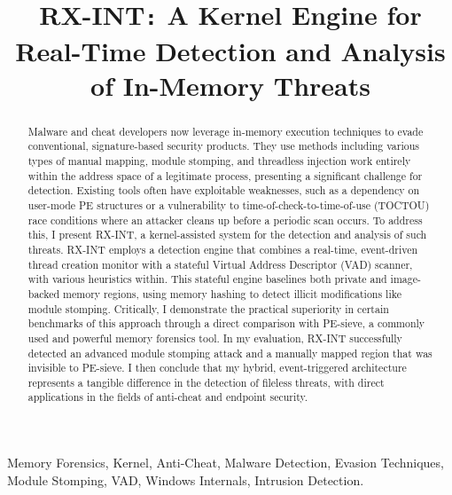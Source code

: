 \documentclass[journal]{IEEEtran}
\title{RX-INT\texttt{:} A Kernel Engine for Real-Time Detection and Analysis of In-Memory Threats}
\author{%
    \IEEEauthorblockN{Arjun Juneja \\}
    \IEEEauthorblockA{School of Electronics and Computer Science\\
    University of Southampton\\
    aj2g24@soton.ac.uk}
}
\begin{document}
\maketitle

\begin{abstract}
Malware and cheat developers now leverage in-memory execution techniques to evade conventional, signature-based security products. They use methods including various types of manual mapping, module stomping, and threadless injection work entirely within the address space of a legitimate process, presenting a significant challenge for detection. Existing tools often have exploitable weaknesses, such as a dependency on user-mode PE structures or a vulnerability to time-of-check-to-time-of-use (TOCTOU) race conditions where an attacker cleans up before a periodic scan occurs. To address this, I present RX-INT, a kernel-assisted system for the detection and analysis of such threats. RX-INT employs a detection engine that combines a real-time, event-driven thread creation monitor with a stateful Virtual Address Descriptor (VAD) scanner, with various heuristics within. This stateful engine baselines both private and image-backed memory regions, using memory hashing to detect illicit modifications like module stomping. Critically, I demonstrate the practical superiority in certain benchmarks of this approach through a direct comparison with PE-sieve, a commonly used and powerful memory forensics tool. In my evaluation, RX-INT successfully detected an advanced module stomping attack and a manually mapped region that was invisible to PE-sieve. I then conclude that my hybrid, event-triggered architecture represents a tangible difference in the detection of fileless threats, with direct applications in the fields of anti-cheat and endpoint security.
\end{abstract}

\begin{IEEEkeywords}
Memory Forensics, Kernel, Anti-Cheat, Malware Detection, Evasion Techniques, Module Stomping, VAD, Windows Internals, Intrusion Detection.
\end{IEEEkeywords}
\end{document}
